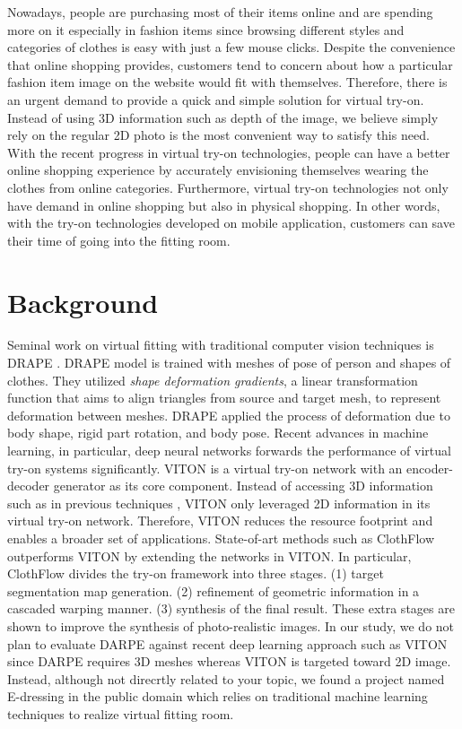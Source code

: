 \documentclass{article}
\begin{document}
Nowadays, people are purchasing most of their items online and are spending more on it especially in fashion items since browsing different styles and categories of clothes is easy with just a few mouse clicks. Despite the convenience that online shopping provides, customers tend to concern about how a particular fashion item image on the website would fit with themselves. Therefore, there is an urgent demand to provide a quick and simple solution for virtual try-on. Instead of using 3D information such as depth of the image, we believe simply rely on the regular 2D photo is the most convenient way to satisfy this need. With the recent progress in virtual try-on technologies, people can have a better online shopping experience by accurately envisioning themselves wearing the clothes from online categories. Furthermore, virtual try-on technologies not only have demand in online shopping but also in physical shopping. In other words, with the try-on technologies developed on mobile application, customers can save their time of going into the fitting room.

\section{Background}\label{background}

Seminal work on virtual fitting with traditional computer vision techniques is DRAPE \cite{guan2012drape}. DRAPE model is trained with meshes of pose of person and shapes of clothes. They utilized \textit{shape deformation gradients}, a linear transformation function that aims to align triangles from source and target mesh, to represent deformation between meshes. DRAPE applied the process of deformation due to body shape, rigid part rotation, and body pose. Recent advances in machine learning, in particular, deep neural networks forwards the performance of virtual try-on systems significantly. VITON \cite{han2018viton} is a virtual try-on network with an encoder-decoder generator as its core component. Instead of accessing 3D information such as in previous techniques \cite{guan2012drape}, VITON only leveraged 2D information in its virtual try-on network. Therefore, VITON reduces the resource footprint and enables a broader set of applications. State-of-art methods such as ClothFlow \cite{han2019clothflow} outperforms VITON by extending the networks in VITON. In particular, ClothFlow divides the try-on framework into three stages. (1) target segmentation map generation. (2) refinement of geometric information in a cascaded warping manner. (3) synthesis of the final result. These extra stages are shown to improve the synthesis of photo-realistic images. In our study, we do not plan to evaluate DARPE against recent deep learning approach such as VITON since DARPE requires 3D meshes whereas VITON is targeted toward 2D image. Instead, although not direcrtly related to your topic, we found a project named E-dressing in the public domain which relies on traditional machine learning techniques to realize virtual fitting room.  
\end{document}
